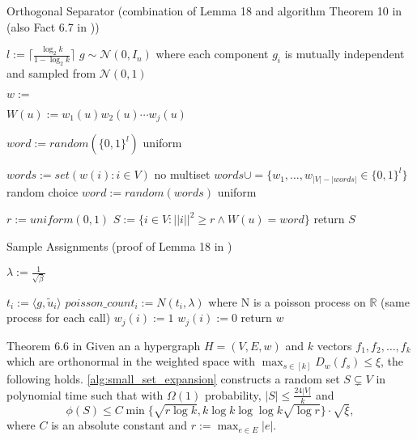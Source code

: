 \begin{algorithm}[h!]
	\caption{Orthogonal Separator (combination of Lemma 18 and algorithm Theorem 10 in \cite{LouisM14} (also Fact 6.7 in \cite{ChanLTZ16})) \label{alg:orthogonal_separator}} 
\begin{algorithmic}
	\State $l := \lceil \frac{\log_2 k}{1-\log_2 k}\rceil$
	\State $g \sim \mathcal{N} (0,I_n)$ where each component $g_i$ is mutually independent and sampled from $\mathcal{N} (0,1)$
	

	
	\State $w := $
	
	\State $W(u) := w_1(u)w_2(u)\cdots w_j(u)$
	\EndFor
	
	\State $word := random( \{0,1\}^l)$ uniform
	
	\Else
	 
	\State $words := set({w(i): i\in V})$  no multiset
	\State $words \cup= \{w_1, \ldots , w_{|V|-|words|} \in \{0,1\}^l\} $ random choice
	\State $word := random(words)$ uniform
	
	\EndIf
	
	\State $r := uniform(0,1)$
	\State $S := \{i \in V: ||i||^2 \ge r \land W(u) = word \}$
	\State return $S$
	
	\EndFunction %
\end{algorithmic}
\end{algorithm}	

	
	
\begin{algorithm}[h!]
	\caption{Sample Assignments (proof of Lemma 18 in \cite{LouisM14}) \label{alg:sample_assignments}} 
	\begin{algorithmic}
		\State $\lambda := \frac{1}{\sqrt{\beta}}$ 
	
	
	\State $t_i := \langle g, \tilde{u}_i \rangle $
	\State $poisson\_count_i := N(t_i, \lambda)$ where N is a poisson process on $\mathbb{R}$ (same process for each call)
	\State $w_j(i) := 1$
	\Else
	\State  $w_j(i) := 0$
	\EndIf
	\EndFor
	\EndFor
	\State return $w$
	\EndFunction %
\end{algorithmic}
\end{algorithm}	
\begin{fact}{Theorem 6.6 in \cite{ChanLTZ16}}
	Given an a hypergraph $H = (V, E, w)$ and $k$ vectors $f_1, f_2, \ldots , f_k$ which are orthonormal in the weighted space with $ \max_{s \in [k]} D_w(f_s) \le \xi $, the following holds. \cref{alg:small_set_expansion} constructs a random set $S \subsetneq V$ in polynomial time such that with $\Omega(1)$ probability, $|S| \le \frac{24|V|}{k}$ and
	 $$\phi(S) \le C \min\{\sqrt{r \log k}, k \log k  \log \log k \sqrt{\log r} \} \cdot \sqrt{\xi},$$ 
	 where $C$ is an absolute constant and $r := \max_{e\in E} |e|$.
\end{fact}

